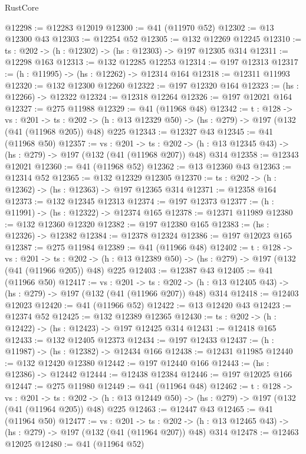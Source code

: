 \begin{lexlean}{RustCore}
\begin{coremodule}
@12298 := @12283 @12019
@12300 := @41 (@11970 @52)
@12302 := @13 @12300 @43
@12303 := @12254 @52
@12305 := @132 @12269 @12245
@12310 := {ts : @202} -> (h : @12302) -> (hs : @12303) -> @197 @12305 @314
@12311 := @12298 @163
@12313 := @132 @12285 @12253
@12314 := @197 @12313
@12317 := (h : @11995) -> (hs : @12262) -> @12314 @164
@12318 := @12311 @11993
@12320 := @132 @12300 @12260
@12322 := @197 @12320 @164
@12323 := (hs : @12266) -> @12322
@12324 := @12318 @12264
@12326 := @197 @12021 @164
@12327 := @275 @11988
@12329 := @41 (@11968 @48)
@12342 := {t : @128} ->
  {vs : @201} ->
  {ts : @202} -> (h : @13 @12329 @50) -> (hs : @279) -> @197 (@132 (@41 (@11968 @205)) @48) @225
@12343 := @12327 @43
@12345 := @41 (@11968 @50)
@12357 := {vs : @201} ->
  {ts : @202} -> (h : @13 @12345 @43) -> (hs : @279) -> @197 (@132 (@41 (@11968 @207)) @48) @314
@12358 := @12343 @12021
@12360 := @41 (@11968 @52)
@12362 := @13 @12360 @43
@12363 := @12314 @52
@12365 := @132 @12329 @12305
@12370 := {ts : @202} -> (h : @12362) -> (hs : @12363) -> @197 @12365 @314
@12371 := @12358 @164
@12373 := @132 @12345 @12313
@12374 := @197 @12373
@12377 := (h : @11991) -> (hs : @12322) -> @12374 @165
@12378 := @12371 @11989
@12380 := @132 @12360 @12320
@12382 := @197 @12380 @165
@12383 := (hs : @12326) -> @12382
@12384 := @12378 @12324
@12386 := @197 @12023 @165
@12387 := @275 @11984
@12389 := @41 (@11966 @48)
@12402 := {t : @128} ->
  {vs : @201} ->
  {ts : @202} -> (h : @13 @12389 @50) -> (hs : @279) -> @197 (@132 (@41 (@11966 @205)) @48) @225
@12403 := @12387 @43
@12405 := @41 (@11966 @50)
@12417 := {vs : @201} ->
  {ts : @202} -> (h : @13 @12405 @43) -> (hs : @279) -> @197 (@132 (@41 (@11966 @207)) @48) @314
@12418 := @12403 @12023
@12420 := @41 (@11966 @52)
@12422 := @13 @12420 @43
@12423 := @12374 @52
@12425 := @132 @12389 @12365
@12430 := {ts : @202} -> (h : @12422) -> (hs : @12423) -> @197 @12425 @314
@12431 := @12418 @165
@12433 := @132 @12405 @12373
@12434 := @197 @12433
@12437 := (h : @11987) -> (hs : @12382) -> @12434 @166
@12438 := @12431 @11985
@12440 := @132 @12420 @12380
@12442 := @197 @12440 @166
@12443 := (hs : @12386) -> @12442
@12444 := @12438 @12384
@12446 := @197 @12025 @166
@12447 := @275 @11980
@12449 := @41 (@11964 @48)
@12462 := {t : @128} ->
  {vs : @201} ->
  {ts : @202} -> (h : @13 @12449 @50) -> (hs : @279) -> @197 (@132 (@41 (@11964 @205)) @48) @225
@12463 := @12447 @43
@12465 := @41 (@11964 @50)
@12477 := {vs : @201} ->
  {ts : @202} -> (h : @13 @12465 @43) -> (hs : @279) -> @197 (@132 (@41 (@11964 @207)) @48) @314
@12478 := @12463 @12025
@12480 := @41 (@11964 @52)

\end{coremodule}
\end{lexlean}
